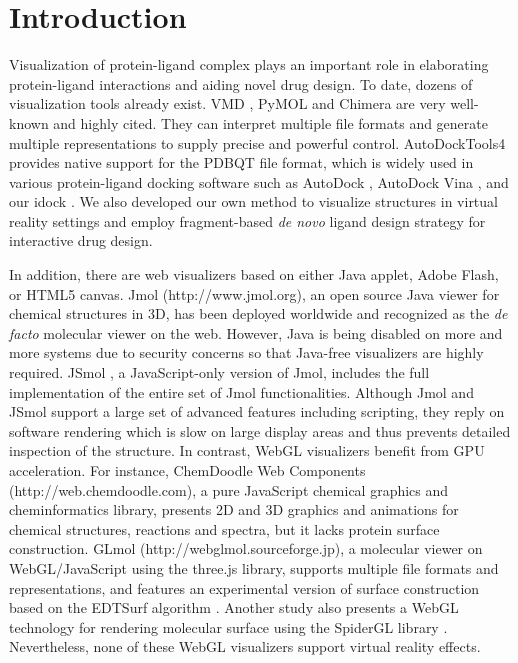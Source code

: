 \documentclass{bioinfo}
\begin{document}
\section{Introduction}

Visualization of protein-ligand complex plays an important role in elaborating protein-ligand interactions and aiding novel drug design. To date, dozens of visualization tools already exist. VMD \citep{1220}, PyMOL \citep{1221} and Chimera \citep{1219} are very well-known and highly cited. They can interpret multiple file formats and generate multiple representations to supply precise and powerful control. AutoDockTools4 \citep{596} provides native support for the PDBQT file format, which is widely used in various protein-ligand docking software such as AutoDock \citep{596}, AutoDock Vina \citep{595}, and our idock \citep{1153}. We also developed our own method \citep{1265} to visualize structures in virtual reality settings and employ fragment-based \textit{de novo} ligand design strategy for interactive drug design.%

In addition, there are web visualizers based on either Java applet, Adobe Flash, or HTML5 canvas. Jmol (http://www.jmol.org), an open source Java viewer for chemical structures in 3D, has been deployed worldwide and recognized as the \textit{de facto} molecular viewer on the web. However, Java is being disabled on more and more systems due to security concerns so that Java-free visualizers are highly required. JSmol \citep{1314}, a JavaScript-only version of Jmol, includes the full implementation of the entire set of Jmol functionalities. Although Jmol and JSmol support a large set of advanced features including scripting, they reply on software rendering which is slow on large display areas and thus prevents detailed inspection of the structure. In contrast, WebGL visualizers benefit from GPU acceleration. For instance, ChemDoodle Web Components (http://web.chemdoodle.com), a pure JavaScript chemical graphics and cheminformatics library, presents 2D and 3D graphics and animations for chemical structures, reactions and spectra, but it lacks protein surface construction. GLmol (http://webglmol.sourceforge.jp), a molecular viewer on WebGL/JavaScript using the three.js library, supports multiple file formats and representations, and features an experimental version of surface construction based on the EDTSurf algorithm \citep{1297,1350}. Another study \citep{1262} also presents a WebGL technology for rendering molecular surface using the SpiderGL library \citep{1320}. Nevertheless, none of these WebGL visualizers support virtual reality effects.
\end{document}
